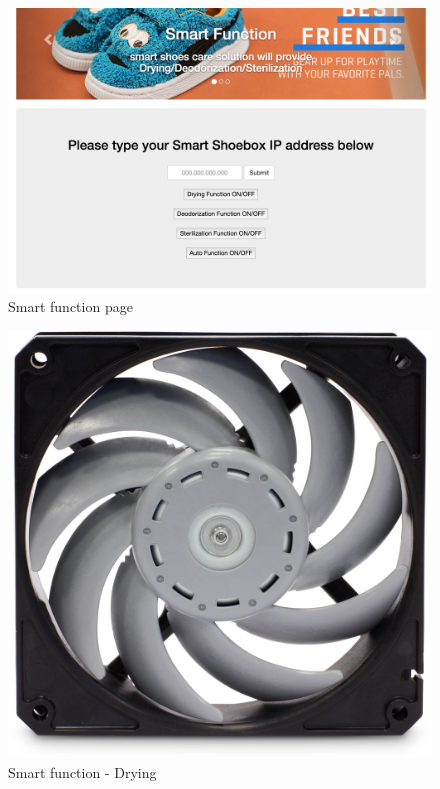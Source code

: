 \documentclass[conference]{IEEEtran}
\begin{document}
\begin{figure}[H]
\begin{center}
    \includegraphics[scale=0.25]{capture4}
    \caption{Smart function page} \label{fig:label}
\end{center}
\end{figure}
\begin{figure}[H]
\begin{center}
    \includegraphics[scale=0.05]{jh1}
    \caption{Smart function - Drying} \label{fig:label}
\end{center}
\end{figure}
\end{document}
